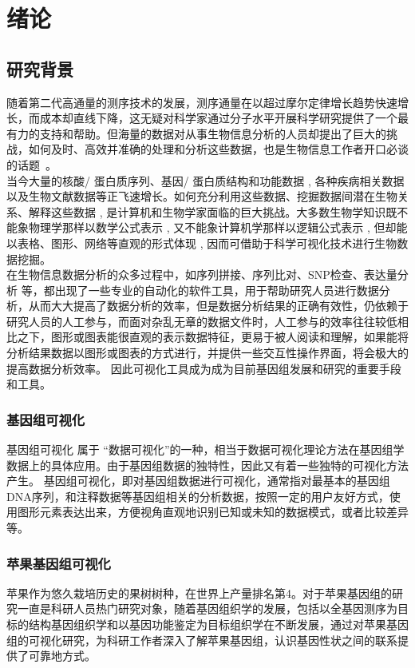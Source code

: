 \chapter{绪论}
	\section{研究背景}
	随着第二代高通量的测序技术的发展，测序通量在以超过摩尔定律增长趋势快速增长，而成本却直线下降，这无疑对科学家通过分子水平开展科学研究提供了一个最有力的支持和帮助。但海量的数据对从事生物信息分析的人员却提出了巨大的挑战，如何及时、高效并准确的处理和分析这些数据，也是生物信息工作者开口必谈的话题~\cite{夏艳2013水稻比较基因组和进化生物学数据库的构建研究}。\\
	\indent 当今大量的核酸/ 蛋白质序列、基因/ 蛋白质结构和功能数据 , 各种疾病相关数据以及生物文献数据等正飞速增长。如何充分利用这些数据、挖掘数据间潜在生物关系、解释这些数据 , 是计算机和生物学家面临的巨大挑战。大多数生物学知识既不能象物理学那样以数学公式表示 , 又不能象计算机学那样以逻辑公式表示 , 但却能以表格、图形、网络等直观的形式体现 , 因而可借助于科学可视化技术进行生物数据挖掘。\\
	\indent 在生物信息数据分析的众多过程中，如序列拼接、序列比对、SNP检查、表达量分析 等，都出现了一些专业的自动化的软件工具，用于帮助研究人员进行数据分析，从而大大提高了数据分析的效率，但是数据分析结果的正确有效性，仍依赖于研究人员的人工参与，而面对杂乱无章的数据文件时，人工参与的效率往往较低相比之下，图形或图表能很直观的表示数据特征，更易于被人阅读和理解，如果能将分析结果数据以图形或图表的方式进行，并提供一些交互性操作界面，将会极大的提高数据分析效率。 因此可视化工具成为成为目前基因组发展和研究的重要手段和工具。
		\subsection{基因组可视化}
		基因组可视化 属于 “数据可视化”的一种，相当于数据可视化理论方法在基因组学数据上的具体应用。由于基因组数据的独特性，因此又有着一些独特的可视化方法产生。
		基因组可视化，即对基因组数据进行可视化，通常指对最基本的基因组DNA序列，和注释数据等基因组相关的分析数据，按照一定的用户友好方式，使用图形元素表达出来，方便视角直观地识别已知或未知的数据模式，或者比较差异等。
		\subsection{苹果基因组可视化}
		苹果作为悠久栽培历史的果树树种，在世界上产量排名第4。对于苹果基因组的研究一直是科研人员热门研究对象，随着基因组织学的发展，包括以全基因测序为目标的结构基因组织学和以基因功能鉴定为目标组织学在不断发展，通过对苹果基因组的可视化研究，为科研工作者深入了解苹果基因组，认识基因性状之间的联系提供了可靠地方式。
